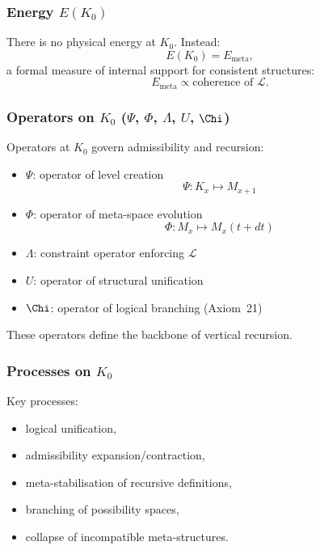 \subsubsection{Energy \texorpdfstring{$E(K_0)$}{E(K_0)}}

There is no physical energy at $K_0$.
Instead:
\[
E(K_0) = E_{\mathrm{meta}},
\]
a formal measure of internal support for consistent structures:
\[
E_{\mathrm{meta}} \propto \text{coherence of }\mathcal{L}.
\]

\subsubsection{Operators on \texorpdfstring{$K_0$}{K_0} (\texorpdfstring{$\Psi$}{\Psi}, \texorpdfstring{$\Phi$}{\Phi}, \texorpdfstring{$\Lambda$}{\Lambda}, \texorpdfstring{$U$}{U}, \texorpdfstring{$\Chi$}{\Chi})}

Operators at $K_0$ govern admissibility and recursion:

\begin{itemize}
    \item $\Psi$: operator of level creation
          \[
          \Psi: K_x \mapsto M_{x+1}
          \]
    \item $\Phi$: operator of meta-space evolution
          \[
          \Phi: M_x \mapsto M_x(t+dt)
          \]
    \item $\Lambda$: constraint operator enforcing $\mathcal{L}$
    \item $U$: operator of structural unification
    \item $\Chi$: operator of logical branching (Axiom~21)
\end{itemize}

These operators define the backbone of vertical recursion.

\subsubsection{Processes on \texorpdfstring{$K_0$}{K_0}}

Key processes:
\begin{itemize}
    \item logical unification,
    \item admissibility expansion/contraction,
    \item meta-stabilisation of recursive definitions,
    \item branching of possibility spaces,
    \item collapse of incompatible meta-structures.
\end{itemize}

